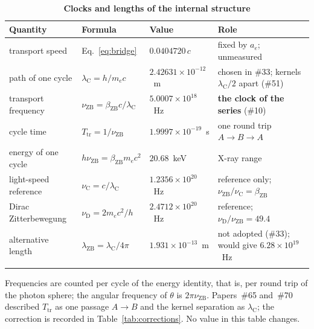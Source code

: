 \documentclass[%
 reprint, amsmath,amssymb, aps, prb, ]{revtex4-2}
\numberwithin{equation}{section}
\newcommand{\betaZB}{\beta_{\text{ZB}}}
\newcommand{\lambdaC}{\lambda_{\text{C}}}
\newcommand{\lambdaZB}{\lambda_{\text{ZB}}}
\newcommand{\nuZB}{\nu_{\text{ZB}}}
\newcommand{\nuC}{\nu_{\text{C}}}
\newcommand{\nuD}{\nu_{\text{D}}}
\newcommand{\Ttr}{T_{\text{tr}}}
\begin{document}
\begin{table}[t!]
\centering
\caption{\textbf{Clocks and lengths of the internal structure}}
\label{tab:clocks}
\renewcommand{\arraystretch}{1.4}
\setlength{\tabcolsep}{7pt}
\begin{tabular}{>{\raggedright\arraybackslash}p{3.8cm}>{\raggedright\arraybackslash}p{2.9cm}>{\raggedright\arraybackslash}p{3.0cm}>{\raggedright\arraybackslash}p{6.1cm}}
\toprule
\textbf{Quantity} & \textbf{Formula} & \textbf{Value} & \textbf{Role} \\
\midrule
transport speed & Eq.~\eqref{eq:bridge} & $0.0404720\,c$ & fixed by $a_e$; unmeasured \\
\addlinespace[0.15cm]
path of one cycle & $\lambdaC = h/m_ec$ & $2.42631\times10^{-12}$~m & chosen in \#33; kernels $\lambdaC/2$ apart (\#51) \\
\addlinespace[0.15cm]
transport frequency & $\nuZB = \betaZB c/\lambdaC$ & $5.0007\times10^{18}$~Hz & \textbf{the clock of the series} (\#10) \\
\addlinespace[0.15cm]
cycle time & $\Ttr = 1/\nuZB$ & $1.9997\times10^{-19}$~s & one round trip $A\to B\to A$ \\
\addlinespace[0.15cm]
energy of one cycle & $h\nuZB = \betaZB m_ec^{2}$ & $20.68$~keV & X-ray range \\
\addlinespace[0.15cm]
light-speed reference & $\nuC = c/\lambdaC$ & $1.2356\times10^{20}$~Hz & reference only; $\nuZB/\nuC = \betaZB$ \\
\addlinespace[0.15cm]
Dirac Zitterbewegung & $\nuD = 2m_ec^{2}/h$ & $2.4712\times10^{20}$~Hz & [standard] reference; $\nuD/\nuZB = 49.4$ \\
\addlinespace[0.15cm]
alternative length & $\lambdaZB = \lambdaC/4\pi$ & $1.931\times10^{-13}$~m & not adopted (\#33); would give $6.28\times10^{19}$~Hz \\
\addlinespace[0.1cm]
\bottomrule
\end{tabular}
\vspace{0.2cm}
\begin{minipage}{0.95\textwidth}
\justifying\footnotesize
Frequencies are counted per cycle of the energy identity, that is, per round trip of the photon sphere; the angular frequency of $\theta$ is $2\pi\nuZB$. Papers~\#65 and~\#70 described $\Ttr$ as one passage $A\to B$ and the kernel separation as $\lambdaC$; the correction is recorded in Table~\ref{tab:corrections}. No value in this table changes.
\end{minipage}
\end{table}
\end{document}

